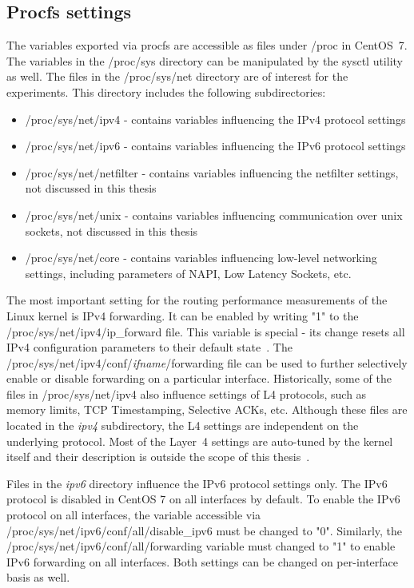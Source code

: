 
\subsection{Procfs settings}\label{sub:analysis-settings-procfs}
The variables exported via procfs are accessible as files under /proc in CentOS~7.
The variables in the /proc/sys directory can be manipulated by the sysctl utility as well.
The files in the /proc/sys/net directory are of interest for the experiments.
This directory includes the following subdirectories:
\begin{itemize}
\item /proc/sys/net/ipv4 - contains variables influencing the IPv4 protocol settings
\item /proc/sys/net/ipv6 - contains variables influencing the IPv6 protocol settings
\item /proc/sys/net/netfilter - contains variables influencing the netfilter settings, not discussed in this thesis
\item /proc/sys/net/unix - contains variables influencing communication over unix sockets, not discussed in this thesis
\item /proc/sys/net/core - contains variables influencing low-level networking settings, including parameters of NAPI, Low Latency Sockets, etc.
\end{itemize}

The most important setting for the routing performance measurements of the Linux kernel is IPv4 forwarding.
It can be enabled by writing "1" to the /proc/sys/net/ipv4/ip\_forward file.
This variable is special - its change resets all IPv4 configuration parameters to their default state~\cite{kernel-doc-ip-sysctl}.
The /proc/sys/net/ipv4/conf/{\it{ifname}}/forwarding file can be used
to further selectively enable or disable forwarding on a particular interface.
Historically, some of the files in /proc/sys/net/ipv4 also influence settings of L4 protocols,
such as memory limits, TCP Timestamping, Selective ACKs, etc.
Although these files are located in the {\it{ipv4}} subdirectory, the L4 settings are independent on the underlying protocol.
Most of the Layer~4 settings are auto-tuned by the kernel itself and
their description is outside the scope of this thesis~\cite{linux-kernel-networking}.

Files in the {\it{ipv6}} directory influence the IPv6 protocol settings only.
The IPv6 protocol is disabled in CentOS 7 on all interfaces by default.
To enable the IPv6 protocol on all interfaces,
the variable accessible via /proc/sys/net/ipv6/conf/all/disable\_ipv6 must be changed to "0".
Similarly, the /proc/sys/net/ipv6/conf/all/forwarding variable must changed to "1" to enable IPv6 forwarding on all interfaces.
Both settings can be changed on per-interface basis as well.

